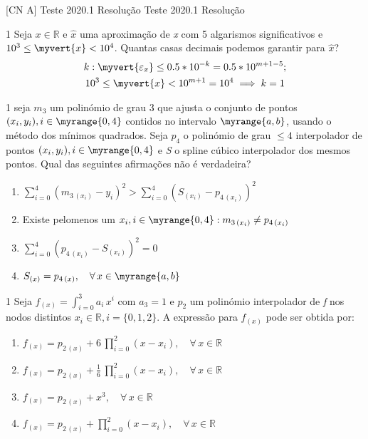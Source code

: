 \documentclass[./CN_A-Tests_Resolutions.tex]{subfiles}
\begin{document}

[CN A]
{Teste 2020.1 Resolução} %
{Teste 2020.1 Resolução} %

\begin{questionBox}1{} %
  Seja \(x\in\mathbb{R}\text{ e }\hat{x}\) uma aproximação de \textit{x} com 5 algarismos significativos e \(10^3\leq\myvert{x}<10^4\). Quantas casas decimais podemos garantir para \(\hat{x}\)?
  \answer{}
  \begin{gather*}
    k: \myvert{\varepsilon_x}\leq
    0.5*10^{-k}
    = 0.5*10^{m+1-5}
    ; \\
    10^3
    \leq
    \myvert{x}
    <10^{m+1}
    =10^{4}
    \implies 
    k = 1
  \end{gather*}
\end{questionBox}

\begin{questionBox}1{} %
  seja \(m_3\) um polinómio de grau 3 que ajusta o conjunto de pontos \((x_i,y_i),i\in\myrange{0,4}\) contidos no intervalo \(\myrange{a,b}\), usando o método dos mínimos quadrados. Seja \(p_4\) o polinómio de grau \(\leq4\) interpolador de pontos \((x_i,y_i),i\in\myrange{0,4}\) e \textit{S} o spline cúbico interpolador dos mesmos pontos. Qual das seguintes afirmações não é verdadeira?
  \begin{enumerate}[label=\alph{enumi})]
    \item \(
        \sum_{i=0}^4{(m_{3\,(x_i)}-y_i)^2}
        >
        \sum_{i=0}^4{(S_{(x_i)}-p_{4\,(x_i)})^2}
      \)
    \item Existe pelomenos um \(x_i,i\in\myrange{0,4}:m_{3\,(x_i)}\neq p_{4\,(x_i)}\)
    \item \(\sum_{i=0}^{4}{(p_{4\,(x_i)}-S_{(x_i)})^2}=0\)
    \item \(S_{(x)}=p_{4\,(x)},\quad\forall\,x\in\myrange{a,b}\)
  \end{enumerate}
\end{questionBox}

\begin{questionBox}1{} %
  Seja \(f_{(x)}=\int_{i=0}^{3}{a_i\,x^i}\) com \(a_3=1\text{ e }p_2\) um polinómio interpolador de \textit{f} nos nodos distintos \(x_i\in\mathbb{R},i=\{0,1,2\}\). A expressão para \(f_{(x)}\) pode ser obtida por:
  \begin{enumerate}[label=\alph{enumi})]
    \item \(f_{(x)}=p_{2\,(x)}+6\,\prod_{i=0}^{2}{(x-x_i)},\quad\forall\,x\in\mathbb{R}\)
    \item \(f_{(x)}=p_{2\,(x)}+\frac{1}{6}\,\prod_{i=0}^{2}{(x-x_i)},\quad\forall\,x\in\mathbb{R}\)
    \item \(f_{(x)}=p_{2\,(x)}+x^3,\quad\forall\,x\in\mathbb{R}\)
    \item \(f_{(x)}=p_{2\,(x)}+\prod_{i=0}^{2}{(x-x_i)},\quad\forall\,x\in\mathbb{R}\)
  \end{enumerate}
\end{questionBox}
\end{document}
